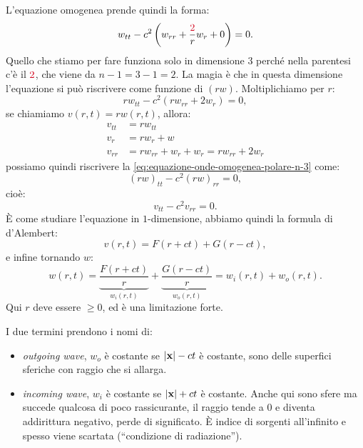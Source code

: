 L'equazione omogenea prende quindi la forma:
\begin{equation}
    w_{tt} -c^{2}\left(w_{rr} +\frac{\textcolor[rgb]{0.82,0.01,0.11}{2}}{r} w_{r} +0\right) =0.
    \label{eq:equazione-onde-omogenea-polare-n-3}
\end{equation}
Quello che stiamo per fare funziona solo in dimensione $3$ perché nella parentesi c'è il $\textcolor[rgb]{0.82,0.01,0.11}{2}$, che viene da $n-1=3-1=2$. La magia è che in questa dimensione l'equazione si può riscrivere come funzione di $(rw)$. Moltiplichiamo per $r$:
\begin{equation*}
    rw_{tt} -c^{2}(rw_{rr} +2w_{r}) =0,
\end{equation*}
se chiamiamo $v(r,t) =rw(r,t)$, allora:
\begin{align*}
    v_{tt} & =rw_{tt}                                \\
    v_{r}  & =rw_{r} +w                              \\
    v_{rr} & =rw_{rr} +w_{r} +w_{r} =rw_{rr} +2w_{r}
\end{align*}
possiamo quindi riscrivere la \eqref{eq:equazione-onde-omogenea-polare-n-3} come:
\begin{equation}
    (rw)_{tt} -c^{2}(rw)_{rr} =0,
\end{equation}
cioè:
\begin{equation}
    v_{tt} -c^{2} v_{rr} =0.
\end{equation}
È come studiare l'equazione in $1$-dimensione, abbiamo quindi la formula di d'Alembert:
\begin{equation}
    v(r,t) =F(r+ct) +G(r-ct) ,
\end{equation}
e infine tornando $w$:
\begin{equation}
    \boxed{w(r,t) =\underbrace{\frac{F(r+ct)}{r}}_{w_{i}(r,t)} +\underbrace{\frac{G(r-ct)}{r}}_{w_{o}(r,t)} =w_{i}(r,t) +w_{o}(r,t)} .
\end{equation}
Qui $r$ deve essere $\geq 0$, ed è una limitazione forte.

I due termini prendono i nomi di:
\begin{itemize}
    \item \textit{outgoing wave}, $w_{o}$ è costante se $| \mathbf{x}| -ct$ è costante, sono delle superfici sferiche con raggio che si allarga.
    \item \textit{incoming wave}, $w_{i}$ è costante se $| \mathbf{x}| +ct$ è costante. Anche qui sono sfere ma succede qualcosa di poco rassicurante, il raggio tende a $0$ e diventa addirittura negativo, perde di significato. È indice di sorgenti all'infinito e spesso viene scartata (``condizione di radiazione'').
\end{itemize}
